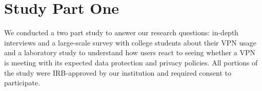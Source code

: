 \section{Study Part One}
We conducted a two part study to answer our research questions:  in-depth interviews and  a large-scale survey with college students about their VPN usage and a laboratory study to understand how users react to seeing whether a VPN is meeting with its expected data protection and privacy policies. All portions of the study were IRB-approved by our institution and required consent to participate.



